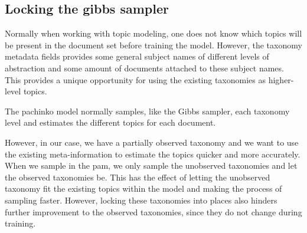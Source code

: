 \subsection{Locking the gibbs sampler}\label{sec:appendix/locking}
Normally when working with topic modeling, one does not know which topics will be present in the document set before training the model.
However, the taxonomy metadata fields provides some general subject names of different levels of abstraction and some amount of documents attached to these subject names.
This provides a unique opportunity for using the existing taxonomies as higher-level topics.

The pachinko model normally samples, like the Gibbs sampler, each taxonomy level and estimates the different topics for each document.

However, in our case, we have a partially observed taxonomy and we want to use the existing meta-information to estimate the topics quicker and more accurately.
When we sample in the \gls{pam}, we only sample the unobserved taxonomies and let the observed taxonomies be. 
This has the effect of letting the unobserved taxonomy fit the existing topics within the model and making the process of sampling faster.
However, locking these taxonomies into places also hinders further improvement to the observed taxonomies, since they do not change during training.   
